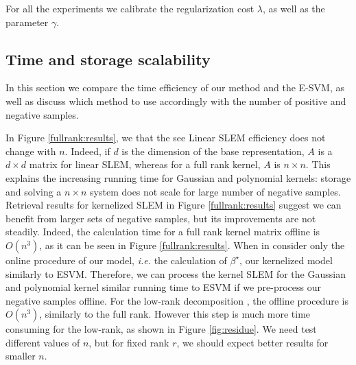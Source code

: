 \begin{table*}[h!]
\begin{center}
\begin{tabular}{c@{\hskip 1em}cccc@{\hskip 1em}cccc@{\hskip 1em}cc}
\hline
\end{tabular}
\caption{Mean average precision results for INRIA Holidays and Oxford buildings datasets, expressed as percentages. In this table, we present our results for VLAD \cite{Delhumeau2013}, sum-pooling of convolutional features (SPoC) \cite{babenko15}, activation coefficients from the previous-to-last CNN layer (AlexNet) \cite{Krizhevsky2012} and activation of NetVLAD layer~\cite{Arandjelovic15}. In parenthesis, the rank of he decomposition ('fr' for full rank decomposition)}
\end{center}
\label{fullrank:results}
\end{table*}

For all the experiments we calibrate the regularization cost $\lambda$, as well as the parameter $\gamma$. 



\subsection{Time and storage scalability} \label{time-scale}
In this section we compare the time efficiency of our method and the E-SVM, as well as discuss which method to use accordingly with the number of positive and negative samples.

In Figure \ref{fullrank:results}, we that the see Linear SLEM efficiency does not change with $n$.
Indeed, if $d$ is the dimension of the base representation, $A$ is a $d\times d$ matrix for linear SLEM, whereas for a full rank kernel, $A$ is $n\times n$.
This explains the increasing running time for Gaussian and polynomial kernels: storage and solving a $n\times n$ system does not scale for large number of negative samples.
Retrieval results for kernelized SLEM in Figure \ref{fullrank:results} suggest we can benefit from larger sets of negative samples, but its improvements are not steadily. Indeed, the calculation time for a full rank kernel matrix offline is $O(n^3)$, as it can be seen in Figure \ref{fullrank:results}.
When in consider only the online procedure of our model, \emph{i.e.} the calculation of $\beta^\star$, our kernelized model similarly to ESVM. Therefore, we can process the kernel SLEM for the Gaussian and polynomial kernel similar running time to ESVM if we pre-process our negative samples offline.
For the low-rank decomposition , the offline procedure is $O(n^3)$, similarly to the full rank. However this step is much more time consuming for the low-rank, as shown in Figure \ref{fig:residue}. We need test different values of $n$, but for fixed rank $r$, we should expect better results for smaller $n$.    


